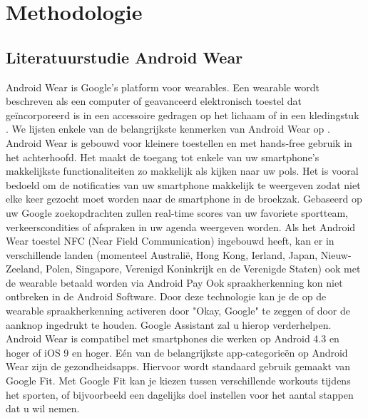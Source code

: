 
\chapter{Methodologie}
\label{ch:methodologie}


\section{Literatuurstudie Android Wear}
\label{sec:androidwear}
Android Wear is Google's platform voor wearables. Een wearable wordt beschreven als een computer of geavanceerd elektronisch toestel dat geïncorporeerd is in een accessoire gedragen op het lichaam of in een kledingstuk \autocite{Dictionary}.
We lijsten enkele van de  belangrijkste kenmerken van Android Wear op \autocite{Techradar}.
Android Wear is gebouwd voor kleinere toestellen en met hands-free gebruik in het achterhoofd. Het maakt de toegang tot enkele van uw smartphone's makkelijkste functionaliteiten zo makkelijk als kijken naar uw pols. Het is vooral bedoeld om de notificaties van uw smartphone makkelijk te weergeven zodat niet elke keer gezocht moet worden naar de smartphone in de broekzak. Gebaseerd op uw Google zoekopdrachten zullen real-time scores van uw favoriete sportteam, verkeerscondities of afspraken in uw agenda weergeven worden. Als het Android Wear toestel NFC (Near Field Communication) ingebouwd heeft, kan er in verschillende landen (momenteel Australië, Hong Kong, Ierland, Japan, Nieuw-Zeeland, Polen, Singapore, Verenigd Koninkrijk en de Verenigde Staten) ook met de wearable betaald worden via Android Pay \autocite{Androidpay} Ook spraakherkenning kon niet ontbreken in de Android Software. Door deze technologie kan je de op de wearable spraakherkenning activeren door "Okay, Google" te zeggen of door de aanknop ingedrukt te houden. Google Assistant zal u hierop verderhelpen. Android Wear is compatibel met smartphones die werken op Android 4.3 en hoger of iOS 9 en hoger. Eén van de belangrijkste app-categorieën op Android Wear zijn de gezondheidsapps. Hiervoor wordt standaard gebruik gemaakt van Google Fit. Met Google Fit kan je kiezen tussen verschillende workouts tijdens het sporten, of bijvoorbeeld een dagelijks doel instellen voor het aantal stappen dat u wil nemen.  
